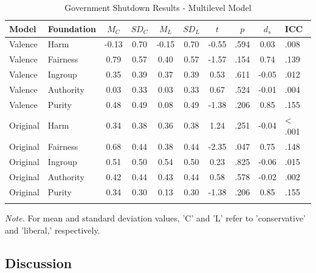 \documentclass[
  man,floatsintext]{apa6}
\begin{document}
\begin{table}[ht]

\begin{center}
\begin{threeparttable}

\caption{\label{tab:exp2-tablegs}Government Shutdown Results - Multilevel Model}

\footnotesize{

\begin{tabular}{llcccccccl}
\toprule
Model & Foundation & $M_C$ & $SD_C$ & $M_L$ & $SD_L$ & $t$ & $p$ & $d_s$ & ICC\\
\midrule
Valence & Harm & -0.13 & 0.70 & -0.15 & 0.70 & -0.55 & .594 & 0.03 & .008\\
Valence & Fairness & 0.79 & 0.57 & 0.40 & 0.57 & -1.57 & .154 & 0.74 & .139\\
Valence & Ingroup & 0.35 & 0.39 & 0.37 & 0.39 & 0.53 & .611 & -0.05 & .012\\
Valence & Authority & 0.03 & 0.33 & 0.03 & 0.33 & 0.67 & .524 & -0.01 & .004\\
Valence & Purity & 0.48 & 0.49 & 0.08 & 0.49 & -1.38 & .206 & 0.85 & .155\\
Original & Harm & 0.34 & 0.38 & 0.36 & 0.38 & 1.24 & .251 & -0.04 & < .001\\
Original & Fairness & 0.68 & 0.44 & 0.38 & 0.44 & -2.35 & .047 & 0.75 & .148\\
Original & Ingroup & 0.51 & 0.50 & 0.54 & 0.50 & 0.23 & .825 & -0.06 & .015\\
Original & Authority & 0.42 & 0.44 & 0.43 & 0.44 & 0.58 & .578 & -0.02 & .002\\
Original & Purity & 0.34 & 0.30 & 0.13 & 0.30 & -1.38 & .206 & 0.85 & .155\\
\bottomrule
\addlinespace
\end{tabular}

}

\begin{tablenotes}[para]
\normalsize{\textit{Note.} For mean and standard deviation values, 'C' and 'L' refer to 'conservative' and 'liberal,' respectively.}
\end{tablenotes}

\end{threeparttable}
\end{center}

\end{table}

\subsection{Discussion}\label{discussion-2}
\end{document}
